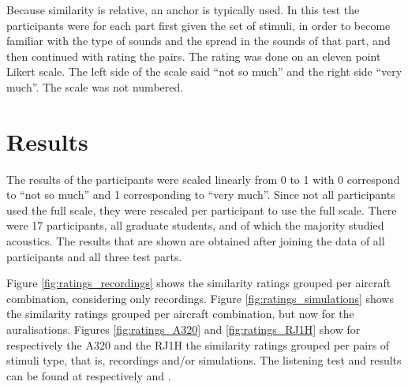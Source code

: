 Because similarity is relative, an anchor is typically used. In this test the
participants were for each part first given the set of stimuli, in order to
become familiar with the type of sounds and the spread in the sounds of that
part, and then continued with rating the pairs. The rating was done on an eleven
point Likert scale. The left side of the scale said ``not so much'' and the right
side ``very much''. The scale was not numbered.


\section{Results}
The results of the participants were scaled linearly from 0 to 1 with 0
correspond to ``not so much'' and 1 corresponding to ``very much''. Since not
all participants used the full scale, they were rescaled per participant to use
the full scale. There were 17 participants, all graduate students, and of which
the majority studied acoustics. The results that are shown are obtained after
joining the data of all participants and all three test parts.

Figure \ref{fig:ratings_recordings} shows the similarity ratings grouped per
aircraft combination, considering only recordings. Figure
\ref{fig:ratings_simulations} shows the similarity ratings grouped per
aircraft combination, but now for the auralisations.
Figures \ref{fig:ratings_A320} and \ref{fig:ratings_RJ1H} show
for respectively the A320 and the RJ1H the similarity ratings grouped per pairs
of stimuli type, that is, recordings and/or simulations.
The listening test and results can be found at respectively \cite{Rietdijk2017a} and \cite{Rietdijk2017b}.



